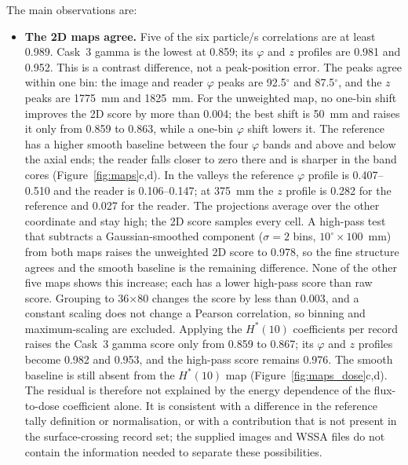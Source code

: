 \documentclass[11pt,a4paper]{article}
\begin{document}
The main observations are:
{\small
\begin{itemize}
  \item \textbf{The 2D maps agree.}  Five of the six particle/s
        correlations are at least 0.989.  Cask~3 gamma is the lowest at 0.859;
        its $\varphi$ and $z$ profiles are 0.981 and 0.952.  This is a contrast
        difference, not a peak-position error.  The peaks agree within one bin:
        the image and reader $\varphi$ peaks are 92.5$^\circ$ and 87.5$^\circ$,
        and the $z$ peaks are 1775~mm and 1825~mm.  For the unweighted map, no
        one-bin shift improves the 2D score by more than 0.004; the best shift
        is 50~mm and raises it only from 0.859 to 0.863, while a one-bin
        $\varphi$ shift lowers it.  The reference has a higher smooth baseline
        between the four $\varphi$ bands and above and below the axial ends;
        the reader falls closer to zero there and is sharper in the band cores
        (Figure~\ref{fig:maps}c,d).  In the valleys the reference $\varphi$
        profile is 0.407--0.510 and the reader is 0.106--0.147; at 375~mm the
        $z$ profile is 0.282 for the reference and 0.027 for the reader.  The
        projections average over the other coordinate and stay high; the 2D
        score samples every cell.  A high-pass test that subtracts a
        Gaussian-smoothed component ($\sigma=2$ bins,
        $10^\circ\times100$~mm) from both maps raises the unweighted 2D score
        to 0.978, so the fine structure agrees and the smooth baseline is the
        remaining difference.  None of the other five maps shows this increase;
        each has a lower high-pass score than raw score.  Grouping to
        36$\times$80 changes the score by less than 0.003, and a constant
        scaling does not change a Pearson correlation, so binning and
        maximum-scaling are excluded.
        Applying the $H^*(10)$ coefficients per record raises the Cask~3 gamma
        score only from 0.859 to 0.867; its $\varphi$ and $z$ profiles become
        0.982 and 0.953, and the high-pass score remains 0.976.  The smooth
        baseline is still absent from the $H^*(10)$ map
        (Figure~\ref{fig:maps_dose}c,d).  The residual is therefore not
        explained by the energy dependence of the flux-to-dose coefficient
        alone.  It is consistent with a difference in the reference tally
        definition or normalisation, or with a contribution that is not present
        in the surface-crossing record set; the supplied images and WSSA files
        do not contain the information needed to separate these possibilities.

\end{itemize}}
\end{document}
